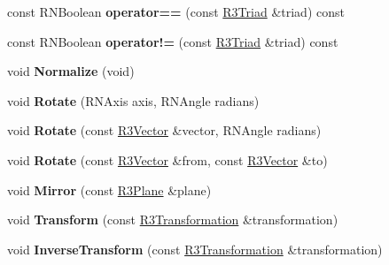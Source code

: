 \begin{DoxyCompactItemize}
\item 
const R\+N\+Boolean {\bfseries operator==} (const \hyperlink{class_r3_triad}{R3\+Triad} \&triad) const \hypertarget{class_r3_triad_a00bccce11a563cee49da9c707b6bad67}{}\label{class_r3_triad_a00bccce11a563cee49da9c707b6bad67}

\item 
const R\+N\+Boolean {\bfseries operator!=} (const \hyperlink{class_r3_triad}{R3\+Triad} \&triad) const \hypertarget{class_r3_triad_a86593eb8e77ef8bff13643d242e7475e}{}\label{class_r3_triad_a86593eb8e77ef8bff13643d242e7475e}

\item 
void {\bfseries Normalize} (void)\hypertarget{class_r3_triad_ab813ec5d5da8d37c711b77dce31c604b}{}\label{class_r3_triad_ab813ec5d5da8d37c711b77dce31c604b}

\item 
void {\bfseries Rotate} (R\+N\+Axis axis, R\+N\+Angle radians)\hypertarget{class_r3_triad_a68c5d2d872da08450d28930c0e44aba7}{}\label{class_r3_triad_a68c5d2d872da08450d28930c0e44aba7}

\item 
void {\bfseries Rotate} (const \hyperlink{class_r3_vector}{R3\+Vector} \&vector, R\+N\+Angle radians)\hypertarget{class_r3_triad_aacafe46c8edcd3f62fd52ea84f3874c4}{}\label{class_r3_triad_aacafe46c8edcd3f62fd52ea84f3874c4}

\item 
void {\bfseries Rotate} (const \hyperlink{class_r3_vector}{R3\+Vector} \&from, const \hyperlink{class_r3_vector}{R3\+Vector} \&to)\hypertarget{class_r3_triad_a0d948df1ca034335c0345087adc7e000}{}\label{class_r3_triad_a0d948df1ca034335c0345087adc7e000}

\item 
void {\bfseries Mirror} (const \hyperlink{class_r3_plane}{R3\+Plane} \&plane)\hypertarget{class_r3_triad_a3b7c1d8c7684e43bebe062d8f3c3c6fa}{}\label{class_r3_triad_a3b7c1d8c7684e43bebe062d8f3c3c6fa}

\item 
void {\bfseries Transform} (const \hyperlink{class_r3_transformation}{R3\+Transformation} \&transformation)\hypertarget{class_r3_triad_ab8eab99179c15978f1198871194abed2}{}\label{class_r3_triad_ab8eab99179c15978f1198871194abed2}

\item 
void {\bfseries Inverse\+Transform} (const \hyperlink{class_r3_transformation}{R3\+Transformation} \&transformation)\hypertarget{class_r3_triad_a6049666f25055f918ceda966296d1b71}{}\label{class_r3_triad_a6049666f25055f918ceda966296d1b71}


\end{DoxyCompactItemize}
